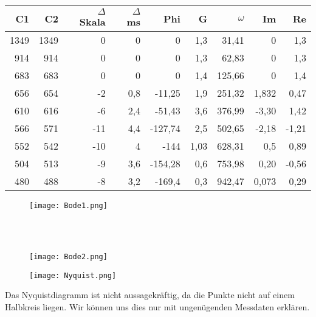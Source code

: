 \hfill \\
\hfill \\


\begin{tabular}{r|r|r|r|r|r|r|r|r}
C1    & C2    & $\Delta$ Skala & $\Delta$ ms & Phi   & G     & $\omega$ & Im    & Re \\
\hline
1349  & 1349  & 0     & 0     & 0     & 1,3   & 31,41 & 0     & 1,3 \\
914   & 914   & 0     & 0     & 0     & 1,3   & 62,83 & 0     & 1,3 \\
683   & 683   & 0     & 0     & 0     & 1,4   & 125,66 & 0     & 1,4 \\
656   & 654   & -2    & 0,8   & -11,25 & 1,9   & 251,32 & 1,832 & 0,47 \\
610   & 616   & -6    & 2,4   & -51,43 & 3,6   & 376,99 & -3,30 & 1,42 \\
566   & 571   & -11   & 4,4   & -127,74 & 2,5   & 502,65 & -2,18 & -1,21 \\
552   & 542   & -10   & 4     & -144  & 1,03  & 628,31 & 0,5 & 0,89 \\
504   & 513   & -9    & 3,6   & -154,28 & 0,6   & 753,98 & 0,20 & -0,56 \\
480   & 488   & -8    & 3,2   & -169,4 & 0,3   & 942,47 & 0,073 & 0,29 \\
\end{tabular}%



\newpage


\begin{figure}[h]
\centering
\texttt{[image: Bode1.png]}
\end{figure}

\hfill \\
\hfill \\


\begin{figure}[h]
\centering
\texttt{[image: Bode2.png]}
\end{figure}


\newpage

\begin{figure}[h]
\centering
\texttt{[image: Nyquist.png]}
\end{figure}


Das Nyquistdiagramm ist nicht aussagekräftig, da die Punkte nicht auf einem Halbkreis liegen. Wir können uns dies nur mit ungenügenden Messdaten erklären.



